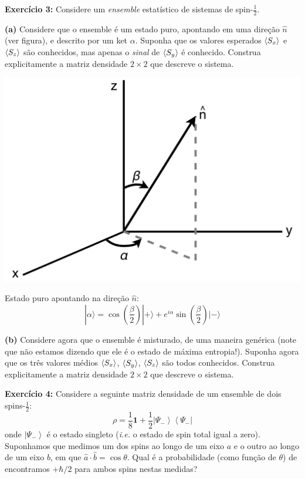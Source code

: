 \documentclass[12pt]{article}
\begin{document}
\vspace*{1em}

\textbf{Exercício 3:} Considere um \emph{ensemble} estatístico de sistemas de spin-$\frac{1}{2}$.

\textbf{(a)} Considere que o ensemble é um estado puro, apontando em uma direção $\hat{n}$ (ver figura), e descrito por um ket $\alpha$. Suponha que os valores esperados $\ev{S_x}$ e $\ev{S_z}$ são conhecidos, mas apenas o \emph{sinal} de $\ev{S_y}$ é conhecido. Construa explicitamente a matriz densidade $2\times2$ que descreve o sistema.

\medskip

\begin{minipage}{0.4\textwidth}
\includegraphics[width=\textwidth]{Figures/nVersor.pdf}
\end{minipage}%
\begin{minipage}{0.6\textwidth}
Estado puro apontando na direção $\hat{n}$:
\[
|\alpha\rangle=\cos \left(\frac{\beta}{2}\right)|+\rangle+e^{i \alpha} \sin \left(\frac{\beta}{2}\right)|-\rangle
\]
\end{minipage}

\medskip

\textbf{(b)} Considere agora que o ensemble é misturado, de uma maneira genérica 
(note que não estamos dizendo que ele é o estado de máxima entropia!). 
Suponha agora que os três valores médios
$\ev{S_x}$, $\ev{S_y}$, $\ev{S_z}$ são todos conhecidos. Construa explicitamente a matriz densidade $2\times2$ que descreve o sistema.

\vspace*{1em}

\textbf{Exercício 4:} Considere a seguinte matriz densidade de um ensemble de dois spins-$\frac{1}{2}$:
\[
\rho=\frac{1}{8} \mathbf{1}+\frac{1}{2}\left|\Psi_{-}\right\rangle\left\langle\Psi_{-}\right|
\]
onde \(\left|\Psi_{-}\right\rangle\) é o estado singleto (\textit{i.e.} o estado de spin total igual a zero). Suponhamos que
medimos um dos spins ao longo de um eixo \(a\) e o outro ao longo de um eixo \(b\), em que
\(\hat{a} \cdot \hat{b}=\cos \theta\). Qual é a probabilidade (como função de \(\theta\)) de encontramos \(+\hbar / 2\) para ambos
spins nestas medidas?
\end{document}

